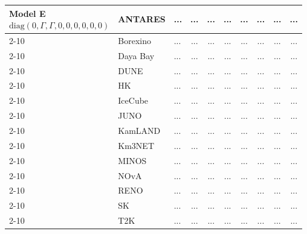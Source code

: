 \begin{table}[H]
{\begin{tabular}{|l|l|l||c|c|c|c|c|c|c|}
\multirow{3}{*}{\parbox{3.2cm}{\centering 
Model E \\[0.5ex]
\scriptsize $\mathrm{diag}(0, \Gamma, \Gamma, 0, 0, 0, 0, 0, 0)$}}
        & ANTARES          & ... & ... & ... & ... & ... & ... & ... & ... \\ \cline{2-10}
        & Borexino         & ... & ... & ... & ... & ... & ... & ... & ... \\ \cline{2-10}
        & Daya Bay         & ... & ... & ... & ... & ... & ... & ... & ... \\ \cline{2-10}
        & DUNE             & ... & ... & ... & ... & ... & ... & ... & ... \\ \cline{2-10}
        & HK & ... & ... & ... & ... & ... & ... & ... & ... \\ \cline{2-10}
        & IceCube          & ... & ... & ... & ... & ... & ... & ... & ... \\ \cline{2-10}
        & JUNO             & ... & ... & ... & ... & ... & ... & ... & ... \\ \cline{2-10}
        & KamLAND          & ... & ... & ... & ... & ... & ... & ... & ... \\ \cline{2-10}
        & Km3NET           & ... & ... & ... & ... & ... & ... & ... & ... \\ \cline{2-10}
        & MINOS            & ... & ... & ... & ... & ... & ... & ... & ... \\ \cline{2-10}
        & NOvA             & ... & ... & ... & ... & ... & ... & ... & ... \\ \cline{2-10}
        & RENO             & ... & ... & ... & ... & ... & ... & ... & ... \\ \cline{2-10}
        & SK               & ... & ... & ... & ... & ... & ... & ... & ... \\ \cline{2-10}
        & T2K              & ... & ... & ... & ... & ... & ... & ... & ... \\ \hline \hline



\end{tabular}}
\end{table}
